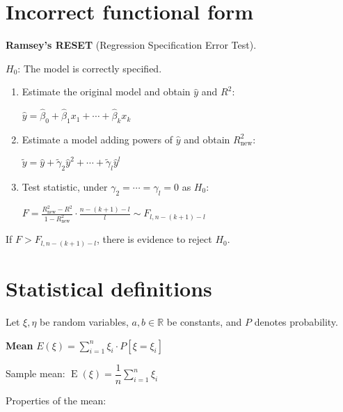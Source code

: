 \documentclass[10pt, a4paper, landscape]{article}
\DeclareMathOperator{\E}{E}
\begin{document}
\begin{multicols}{3}
\columnbreak

\section*{Incorrect functional form}

\textbf{Ramsey's RESET} (Regression Specification Error Test).

\begin{center}
	\( H_{0} \): The model is correctly specified.
\end{center}

\begin{enumerate}[leftmargin=*]
	\item Estimate the original model and obtain \( \hat{y} \) and \( R^{2} \):
	\begin{center}
		\( \hat{y} = \hat{\beta}_{0} + \hat{\beta}_{1} x_{1} + \cdots + \hat{\beta}_{k} x_{k} \)
	\end{center}
	\item Estimate a model adding powers of \( \hat{y} \) and obtain \( R_{\text{new}}^{2} \):
	\begin{center}
		\( \tilde{y} = \hat{y} + \tilde{\gamma}_{2} \hat{y}^{2} + \cdots + \tilde{\gamma}_{l} \hat{y}^{l} \)
	\end{center}
	\item Test statistic, under \( \gamma_{2} = \cdots = \gamma_{l} = 0 \) as \( H_{0} \):
	\begin{center}
		\( F = \frac{R_{\text{new}}^{2} - R^{2}}{1 - R_{\text{new}}^{2}} \cdot \frac{n - (k + 1) - l}{l} \sim F_{l, n - (k + 1) - l} \)
	\end{center}
\end{enumerate}

If \( F > F_{l, n - (k + 1) - l} \), there is evidence to reject \( H_{0} \).

\section*{Statistical definitions}

Let \( \xi, \eta \) be random variables, \( a, b \in \mathbb{R} \) be constants, and \( P \) denotes probability.

\textbf{Mean} \quad \( E(\xi) = \sum_{i = 1}^{n} \xi_{i} \cdot P[\xi = \xi_{i}] \)

Sample mean: \quad \( \E(\xi) = \dfrac{1}{n} \sum_{i = 1}^{n} \xi_{i} \)

Properties of the mean:


\end{multicols}
\end{document}
